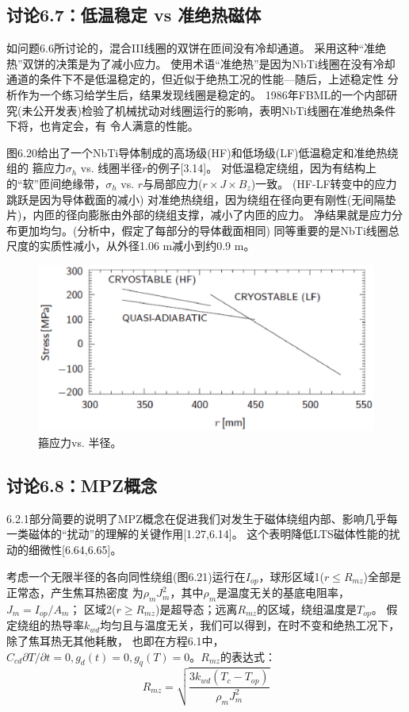 \subsection{讨论6.7：低温稳定 vs 准绝热磁体}
如问题6.6所讨论的，混合III线圈的双饼在匝间没有冷却通道。
采用这种“准绝热”双饼的决策是为了减小应力。
使用术语“准绝热”是因为NbTi线圈在没有冷却通道的条件下不是低温稳定的，但近似于绝热工况的性能---随后，上述稳定性
分析作为一个练习给学生后，结果发现线圈是稳定的。
1986年FBML的一个内部研究(未公开发表)检验了机械扰动对线圈运行的影响，表明NbTi线圈在准绝热条件下将，也肯定会，有
令人满意的性能。

图6.20给出了一个NbTi导体制成的高场级(HF)和低场级(LF)低温稳定和准绝热绕组的
箍应力$\sigma_h$ vs. 线圈半径$r$的例子[3.14]。
对低温稳定绕组，因为有结构上的“软”匝间绝缘带，$\sigma_h$ vs. $r$与局部应力($r\times J\times B_z$)一致。
(HF-LF转变中的应力跳跃是因为导体截面的减小)
对准绝热绕组，因为绕组在径向更有刚性(无间隔垫片)，内匝的径向膨胀由外部的绕组支撑，减小了内匝的应力。
净结果就是应力分布更加均匀。(分析中，假定了每部分的导体截面相同)
同等重要的是NbTi线圈总尺度的实质性减小，从外径1.06 m减小到约0.9 m。

\begin{figure}[htbp]
	\centering
	\includegraphics[scale=0.7]{chpt6/figs/fig6.20.eps}
	\caption{箍应力vs. 半径。}
\end{figure}


\subsection{讨论6.8：MPZ概念}
6.2.1部分简要的说明了MPZ概念在促进我们对发生于磁体绕组内部、影响几乎每一类磁体的“扰动”的理解的关键作用[1.27,6.14]。
这个表明降低LTS磁体性能的扰动的细微性[6.64,6.65]。

考虑一个无限半径的各向同性绕组(图6.21)运行在$I_{op}$，球形区域1($r\le R_{mz}$)全部是正常态，产生焦耳热密度
为$\rho_m J_m^2$，其中$\rho_m$是温度无关的基底电阻率，$J_m=I_{op}/A_m$；
区域2($r\ge R_{mz}$)是超导态；远离$R_{mz}$的区域，绕组温度是$T_{op}$。
假定绕组的热导率$k_{wd}$均匀且与温度无关，我们可以得到，在时不变和绝热工况下，除了焦耳热无其他耗散，
也即在方程6.1中，$C_{cd}\partial T/\partial t=0,g_d(t)=0,g_q(T)=0$。$R_{mz}$的表达式：
\begin{equation}%
R_{mz}=\sqrt{\frac{3k_{wd}(T_c-T_{op})}{\rho_mJ_m^2}}
\end{equation}

